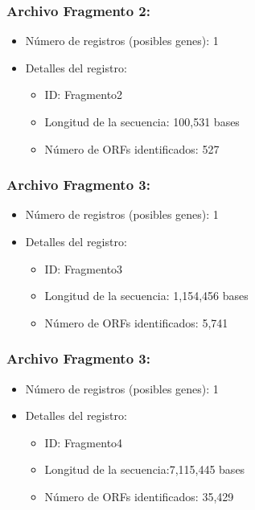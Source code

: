\subsubsection*{Archivo Fragmento 2:}
\begin{itemize}
\item Número de registros (posibles genes): 1
\item Detalles del registro:
  \begin{itemize}
  \item ID: Fragmento2
  \item Longitud de la secuencia: 100,531 bases
  \item Número de ORFs identificados: 527
  \end{itemize}
\end{itemize}

\subsubsection*{Archivo Fragmento 3:}
\begin{itemize}
\item Número de registros (posibles genes): 1
\item Detalles del registro:
  \begin{itemize}
  \item ID: Fragmento3
  \item Longitud de la secuencia: 1,154,456 bases
  \item Número de ORFs identificados: 5,741
  \end{itemize}
\end{itemize}

\subsubsection*{Archivo Fragmento 3:}
\begin{itemize}
\item Número de registros (posibles genes): 1
\item Detalles del registro:
  \begin{itemize}
  \item ID: Fragmento4
  \item Longitud de la secuencia:7,115,445 bases
  \item Número de ORFs identificados: 35,429
  \end{itemize}
\end{itemize}


